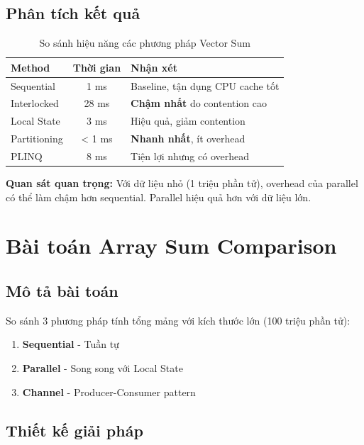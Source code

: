 \documentclass[12pt,a4paper]{article}
\begin{document}
\subsection{Phân tích kết quả}

\begin{table}[h]
\centering
\begin{tabular}{|l|c|l|}
\hline
\textbf{Method} & \textbf{Thời gian} & \textbf{Nhận xét} \\
\hline
Sequential & 1 ms & Baseline, tận dụng CPU cache tốt \\
\hline
Interlocked & 28 ms & \textbf{Chậm nhất} do contention cao \\
\hline
Local State & 3 ms & Hiệu quả, giảm contention \\
\hline
Partitioning & < 1 ms & \textbf{Nhanh nhất}, ít overhead \\
\hline
PLINQ & 8 ms & Tiện lợi nhưng có overhead \\
\hline
\end{tabular}
\caption{So sánh hiệu năng các phương pháp Vector Sum}
\end{table}

\textbf{Quan sát quan trọng:} Với dữ liệu nhỏ (1 triệu phần tử), overhead của parallel có thể làm chậm hơn sequential. Parallel hiệu quả hơn với dữ liệu lớn.

\section{Bài toán Array Sum Comparison}

\subsection{Mô tả bài toán}

So sánh 3 phương pháp tính tổng mảng với kích thước lớn (100 triệu phần tử):

\begin{enumerate}
    \item \textbf{Sequential} - Tuần tự
    \item \textbf{Parallel} - Song song với Local State
    \item \textbf{Channel} - Producer-Consumer pattern
\end{enumerate}

\subsection{Thiết kế giải pháp}
\end{document}
